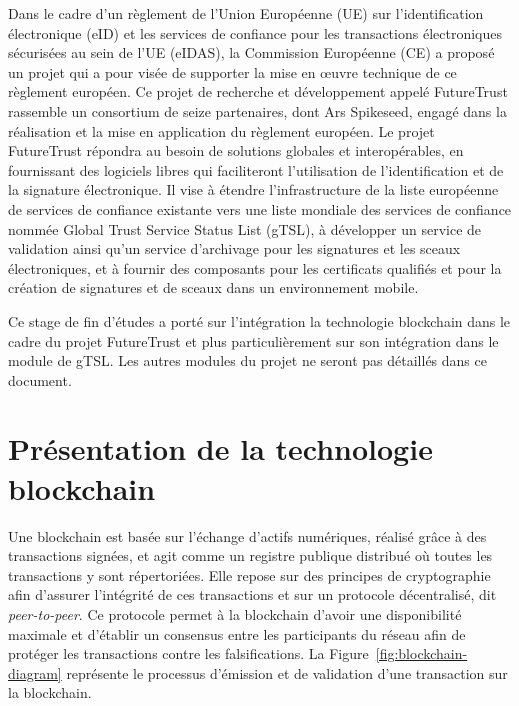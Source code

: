 \documentclass{tnreport}
\begin{document}
Dans le cadre d'un règlement de l'Union Européenne (UE) sur l'identification électronique (eID) et les services de confiance pour les transactions électroniques sécurisées au sein de l'UE (eIDAS), la Commission Européenne (CE) a proposé un projet qui a pour visée de supporter la mise en œuvre technique de ce règlement européen. 
Ce projet de recherche et développement appelé FutureTrust rassemble un consortium de seize partenaires, dont Ar{\texteta}s Spikeseed, engagé dans la réalisation et la mise en application du règlement européen. 
Le projet FutureTrust répondra au besoin de solutions globales et interopérables, en fournissant des logiciels libres qui faciliteront l'utilisation de l'identification et de la signature électronique. 
Il vise à étendre l'infrastructure de la liste européenne de services de confiance existante vers une liste mondiale des services de confiance nommée Global Trust Service Status List (gTSL), à développer un service de validation ainsi qu'un service d'archivage pour les signatures et les sceaux électroniques, et à fournir des composants pour les certificats qualifiés et pour la création de signatures et de sceaux dans un environnement mobile.

Ce stage de fin d'études a porté sur l'intégration la technologie blockchain dans le cadre du projet FutureTrust et plus particulièrement sur son intégration dans le module de gTSL. Les autres modules du projet ne seront pas détaillés dans ce document. 

\section{Présentation de la technologie blockchain}

Une blockchain est basée sur l'échange d'actifs numériques, réalisé grâce à des transactions signées, et agit comme un registre publique distribué où toutes les transactions y sont répertoriées. Elle repose sur des principes de cryptographie afin d'assurer l'intégrité de ces transactions et sur un protocole décentralisé, dit {\em peer-to-peer}. Ce protocole permet à la blockchain d'avoir une disponibilité maximale et d'établir un consensus entre les participants du réseau afin de protéger les transactions contre les falsifications. La Figure~\ref{fig:blockchain-diagram} représente le processus d'émission et de validation d'une transaction sur la blockchain.
\end{document}
